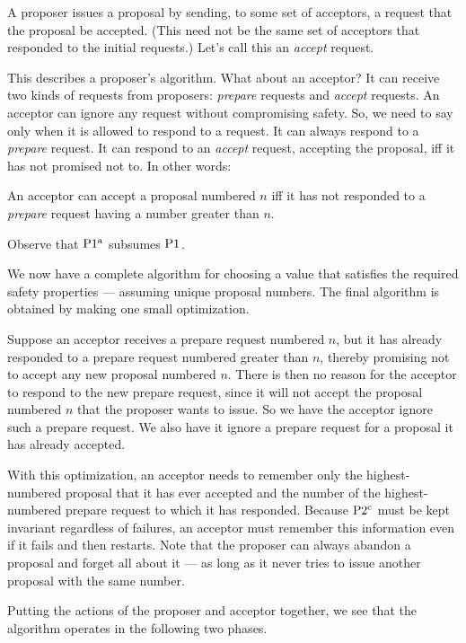 A proposer issues a proposal by sending, to some set of acceptors, a request that the proposal be accepted.
(This need not be the same set of acceptors that responded to the initial requests.)
Let's call this an \emph{accept} request.

This describes a proposer's algorithm.
What about an acceptor?
It can receive two kinds of requests from proposers: \emph{prepare} requests and \emph{accept} requests.
An acceptor can ignore any request without compromising safety.
So, we need to say only when it is allowed to respond to a request.
It can always respond to a \emph{prepare} request.
It can respond to an \emph{accept} request, accepting the proposal, iff it has not promised not to.
In other words:

\begin{paxostheoremenv}[$\PaxosSubtheorem{1}{a}$]
    An acceptor can accept a proposal numbered $n$ iff it has not responded to a \emph{prepare} request having a number greater than $n$.
\end{paxostheoremenv}

Observe that $\PaxosSubtheorem{1}{a}$ subsumes $\operatorname{P1^{}}$.

We now have a complete algorithm for choosing a value that satisfies the required safety properties — assuming unique proposal numbers.
The final algorithm is obtained by making one small optimization.

Suppose an acceptor receives a prepare request numbered $n$, but it has already responded to a prepare request numbered greater than $n$, thereby promising not to accept any new proposal numbered $n$.
There is then no reason for the acceptor to respond to the new prepare request, since it will not accept the proposal numbered $n$ that the proposer wants to issue.
So we have the acceptor ignore such a prepare request.
We also have it ignore a prepare request for a proposal it has already accepted.

With this optimization, an acceptor needs to remember only the highest-numbered proposal that it has ever accepted and the number of the highest-numbered prepare request to which it has responded.
Because $\operatorname{P2^{c}}$ must be kept invariant regardless of failures, an acceptor must remember this information even if it fails and then restarts.
Note that the proposer can always abandon a proposal and forget all about it — as long as it never tries to issue another proposal with the same number.

Putting the actions of the proposer and acceptor together, we see that the algorithm operates in the following two phases.

